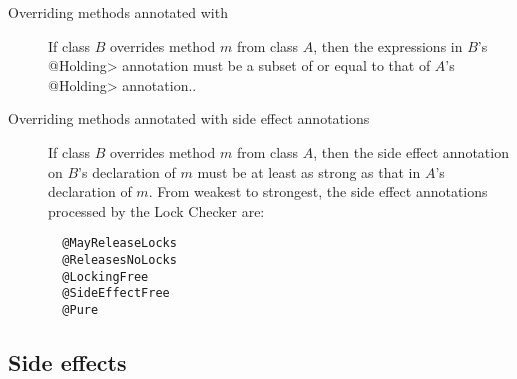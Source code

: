 \begin{description}

\item[Overriding methods annotated with ]
  If class $B$ overrides method $m$ from class $A$, then the expressions in
  $B$'s \<@Holding>
  annotation must be a subset of or equal to that of $A$'s \<@Holding>
  annotation..

\item[Overriding methods annotated with side effect annotations]
  If class $B$ overrides method $m$ from class $A$, then
  the side effect annotation on $B$'s declaration of $m$
  must be at least as strong as that in $A$'s declaration of $m$.
  From weakest to strongest, the side effect annotations
  processed by the Lock Checker are:
\begin{verbatim}
  @MayReleaseLocks
  @ReleasesNoLocks
  @LockingFree
  @SideEffectFree
  @Pure
\end{verbatim}

\end{description}

\subsection{Side effects\label{lock-type-checking-rules-polymorphic-side-effects}}

